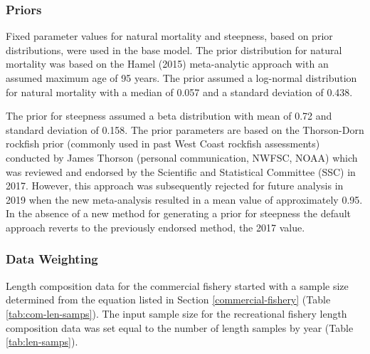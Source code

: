 \documentclass[11pt,
  english,
  a4paper,
]{article}
\begin{document}
\hypertarget{priors}{%
\subsubsection{Priors}\label{priors}}

\leavevmode\tagmcend\tagstructend


Fixed parameter values for natural mortality and steepness, based on prior distributions, were used in the base model. The prior distribution for natural mortality was based on the Hamel {(2015)\leavevmode\tagmcend\tagstructend} meta-analytic approach with an assumed maximum age of 95 years. The prior assumed a log-normal distribution for natural mortality with a median of 0.057 and a standard deviation of 0.438.

\leavevmode\tagmcend\tagstructend\par


The prior for steepness assumed a beta distribution with mean of 0.72 and standard deviation of 0.158. The prior parameters are based on the Thorson-Dorn rockfish prior (commonly used in past West Coast rockfish assessments) conducted by James Thorson (personal communication, NWFSC, NOAA) which was reviewed and endorsed by the Scientific and Statistical Committee (SSC) in 2017. However, this approach was subsequently rejected for future analysis in 2019 when the new meta-analysis resulted in a mean value of approximately 0.95. In the absence of a new method for generating a prior for steepness the default approach reverts to the previously endorsed method, the 2017 value.

\leavevmode\tagmcend\tagstructend\par


\hypertarget{data-weighting}{%
\subsubsection{Data Weighting}\label{data-weighting}}

\leavevmode\tagmcend\tagstructend


Length composition data for the commercial fishery started with a sample size determined from the equation listed in Section \ref{commercial-fishery} (Table \ref{tab:com-len-samps}). The input sample size for the recreational fishery length composition data was set equal to the number of length samples by year (Table \ref{tab:len-samps}).
\end{document}

